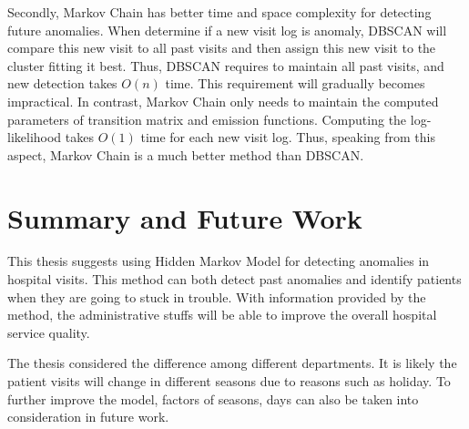 Secondly, Markov Chain has better time and space complexity for detecting future anomalies. When determine if a new visit log is anomaly, DBSCAN will compare this new visit to all past visits and then assign this new visit to the cluster fitting it best. Thus, DBSCAN requires to maintain all past visits, and new detection takes $O(n)$ time. This requirement will gradually becomes impractical. In contrast, Markov Chain only needs to maintain the computed parameters of transition matrix and emission functions. Computing the log-likelihood takes $O(1)$ time for each new visit log. Thus, speaking from this aspect, Markov Chain is a much better method than DBSCAN.

\section{Summary and Future Work}
This thesis suggests using Hidden Markov Model for detecting anomalies in hospital visits. This method can both detect past anomalies and identify patients when they are going to stuck in trouble. With information provided by the method, the administrative stuffs will be able to improve the overall hospital service quality.

The thesis considered the difference among different departments. It is likely the patient visits will change in different seasons due to reasons such as holiday. To further improve the model, factors of seasons, days can also be taken into consideration in future work. 